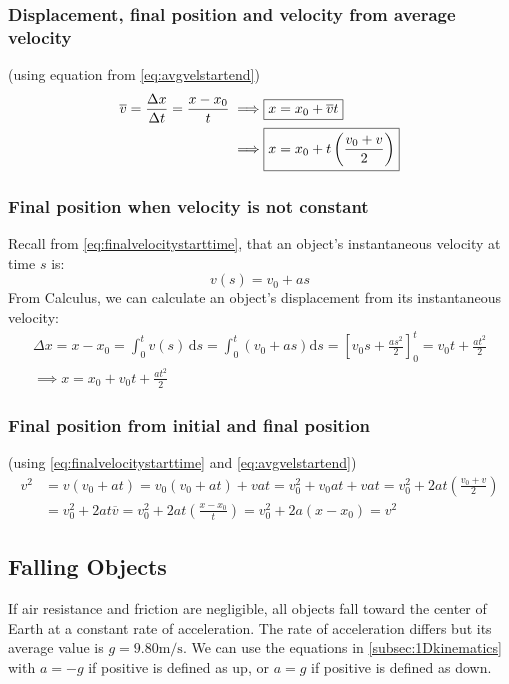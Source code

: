 \documentclass{article}
\begin{document}
\subsubsection{Displacement, final position and velocity from average velocity}

(using equation from \ref{eq:avgvelstartend})
\begin{align*}
    \overline v 
	=\frac{\Delta x}{\Delta t}
	=\frac{x-x_0}{t}
	\implies \Aboxed{x&=x_0+\overline vt} \\ 
	\implies \Aboxed{x&=x_0+t \left( \frac{v_0+v}{2} \right)}
\end{align*}

\subsubsection{Final position when velocity is not constant}
Recall from \ref{eq:finalvelocitystarttime}, that an object's instantaneous velocity at time $s$ is:
\begin{equation*}
	v(s)=v_0+as
\end{equation*}
From Calculus, we can calculate an object's displacement from its instantaneous velocity:
\begin{gather*}
	\Delta x
	=x-x_0
	=\int_{0}^{t}v(s)\,\mathrm{d}s
	=\int_{0}^{t}\left( v_0+as \right)\mathrm{d}s
	=\left[v_0s+\frac{as^2}{2}\right]_{0}^{t}
	=v_0t+\frac{at^2}{2} \\
	\implies \boxed{x=x_0+v_0t+\frac{at^2}{2}}
\end{gather*}

\subsubsection{Final position from initial and final position}

(using \ref{eq:finalvelocitystarttime} and \ref{eq:avgvelstartend})
\begin{align*}
    v^2
	&=v \left( v_0+at \right) 
	=v_0(v_0+at)+vat
	=v_0^2+v_0at+vat
	=v_0^2+2at \left( \frac{v_0+v}{2} \right) \\
	&=v_0^2+2at\overline v
	=v_0^2+2at \left( \frac{x-x_0}{t} \right)
	=\boxed{v_0^2+2a(x-x_0)=v^2}
\end{align*}

\subsection{Falling Objects}

If air resistance and friction are negligible, all objects fall toward the center of Earth at a constant rate of acceleration. The rate of acceleration differs but its average value is $g=9.80 \si{\meter\per\second}$. We can use the equations in \ref{subsec:1Dkinematics} with $a=-g$ if positive is defined as up, or $a=g$ if positive is defined as down.
\end{document}
